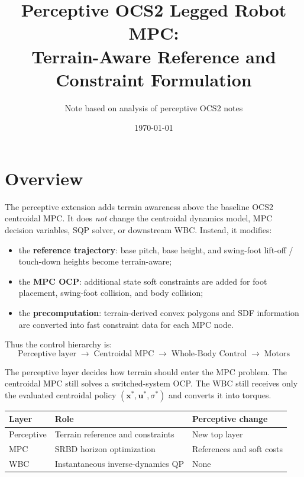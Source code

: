 \documentclass[11pt,a4paper]{article}
\title{Perceptive OCS2 Legged Robot MPC: \\Terrain-Aware Reference and Constraint Formulation}
\author{Note based on analysis of perceptive OCS2 notes}
\date{\today}
\begin{document}
\maketitle
\tableofcontents
\newpage


\section{Overview}

The perceptive extension adds terrain awareness above the baseline OCS2 centroidal MPC. It does \emph{not} change the centroidal dynamics model, MPC decision variables, SQP solver, or downstream WBC. Instead, it modifies:
\begin{itemize}
	\item the \textbf{reference trajectory}: base pitch, base height, and swing-foot lift-off / touch-down heights become terrain-aware;
	\item the \textbf{MPC OCP}: additional state soft constraints are added for foot placement, swing-foot collision, and body collision;
	\item the \textbf{precomputation}: terrain-derived convex polygons and SDF information are converted into fast constraint data for each MPC node.
\end{itemize}

Thus the control hierarchy is:
\begin{equation}
	\boxed{
		\text{Perceptive layer}
		\;\longrightarrow\;
		\text{Centroidal MPC}
		\;\longrightarrow\;
		\text{Whole-Body Control}
		\;\longrightarrow\;
		\text{Motors}
	}
\end{equation}

The perceptive layer decides how terrain should enter the MPC problem. The centroidal MPC still solves a switched-system OCP. The WBC still receives only the evaluated centroidal policy $(\bm{x}^*,\bm{u}^*,\sigma^*)$ and converts it into torques.

\begin{center}
	\begin{tabular}{lll}
		\toprule
		\textbf{Layer} & \textbf{Role} & \textbf{Perceptive change} \\
		\midrule
		Perceptive & Terrain reference and constraints & New top layer \\
		MPC & SRBD horizon optimization & References and soft costs \\
		WBC & Instantaneous inverse-dynamics QP & None \\
		\bottomrule
	\end{tabular}
\end{center}
\end{document}
